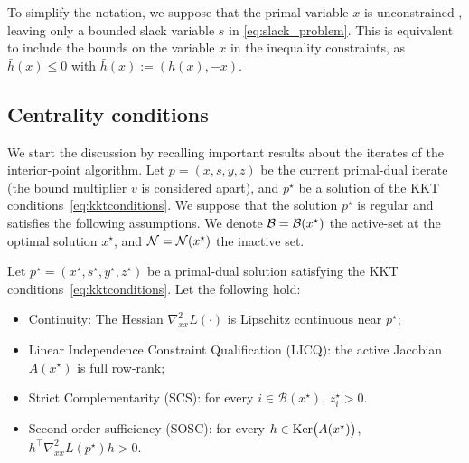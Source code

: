 To simplify the notation, we suppose that the primal variable
$x$ is unconstrained , leaving only a bounded slack variable $s$ in \eqref{eq:slack_problem}.
This is equivalent to include the bounds on the variable $x$ in the inequality constraints,
as $\bar{h}(x) \leq 0$ with $\bar{h}(x) := (h(x), -x)$.

\subsection{Centrality conditions}
We start the discussion by recalling important results about the iterates of the interior-point algorithm.
Let $p = (x, s, y, z)$ be the current primal-dual iterate (the bound multiplier $v$ is considered apart),
and $p^\star$ be a solution of the KKT conditions~\eqref{eq:kktconditions}. We suppose
that the solution $p^\star$ is regular and satisfies the following assumptions.
We denote $\mathcal{B} = \mathcal{B}(x^\star)$ the active-set at the optimal solution $x^\star$, 
and $\mathcal{N} = \mathcal{N}(x^\star)$ the inactive set.

\begin{assumption}
  \label{hyp:ipm}
  Let $p^\star = (x^\star, s^\star, y^\star, z^\star)$ be a primal-dual solution
  satisfying the KKT conditions~\eqref{eq:kktconditions}. Let the following hold:
  \begin{itemize}
  \item Continuity: The Hessian $\nabla^2_{x x} L(\cdot)$ is Lipschitz continuous
    near $p^\star$;
  \item Linear Independence Constraint Qualification (LICQ): the active Jacobian $A(x^\star)$ is full row-rank;
  \item Strict Complementarity (SCS): for every $i \in \mathcal{B}(x^\star)$, $z_i^\star > 0$.
  \item Second-order sufficiency (SOSC): for every $h \in \operatorname{Ker}\!\big(A(x^\star)\big)$,
    $h^\top \nabla_{x x}^2 L(p^\star)h > 0$.
  \end{itemize}
\end{assumption}

